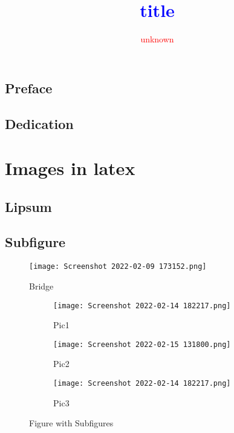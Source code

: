 \documentclass[12pt,a4paper,oneside]{book}
\title{\huge{\textbf{\textcolor{blue}{title}}}}
\author{\textcolor{red}{unknown}}
\begin{document}
    \section*{Preface}
        \lipsum[1-3]
    \newpage
    \section*{Dedication}
        \lipsum[1-2]
    \newpage
    \tableofcontents
    \listoffigures
    \listoftables
    
    \chapter{Images in latex}
        \section{Lipsum}
            \lipsum[1-3]\cite{eins}
        \section{Subfigure}
            \lipsum[1-2]\cite{goose}
            \begin{figure}
                \centering
                \texttt{[image: Screenshot 2022-02-09 173152.png]}
                \caption{Bridge}
                \label{pic}
            \end{figure}
            \begin{figure}
                \begin{subfigure}[]{0.4\linewidth}
                    \centering
                    \texttt{[image: Screenshot 2022-02-14 182217.png]}
                    \caption{Pic1}
                \end{subfigure}
                \begin{subfigure}[]{0.4\linewidth}
                    \centering
                    \texttt{[image: Screenshot 2022-02-15 131800.png]}
                    \caption{Pic2}
                \end{subfigure}
                \centering
                \begin{subfigure}[]{0.4\linewidth}
                    \centering
                    \texttt{[image: Screenshot 2022-02-14 182217.png]}
                    \caption{Pic3}
                \end{subfigure}
                \caption{Figure with Subfigures}
                \label{fig:enter-label}
            \end{figure}
\end{document}
